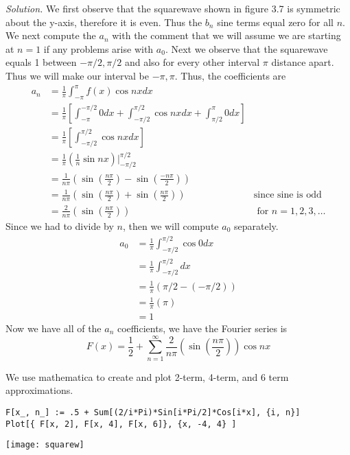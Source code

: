 \documentclass{article}
\begin{document}
\vspace{4mm} 
\textit{Solution.} We first observe that the squarewave shown in figure 3.7 is symmetric about the y-axis, therefore it is even. Thus the \(b_n\) sine terms equal zero for all \(n\). We next compute the \(a_n\) with the comment that we will assume we are starting at \(n=1\) if any problems arise with \(a_0\). Next we observe that the squarewave equals 1 between \(-\pi/2 , \pi/2\) and also for every other interval \(\pi\) distance apart. Thus we will make our interval be \( -\pi,\pi\). Thus, the coefficients are
 \begin{align*}
a_n &= \frac{1}{\pi} \int_{-\pi}^{\pi} f(x) \cos nx dx \\
&= \frac{1}{\pi}\left[ \int_{-\pi}^{-\pi/2} 0 dx + \int_{-\pi/2}^{\pi/2} \cos nx dx +  \int_{\pi/2}^{\pi} 0 dx\right] \\
&=  \frac{1}{\pi}\left[ \int_{-\pi/2}^{\pi/2} \cos nx dx  \right] \\
&=  \frac{1}{\pi} (\frac1n \sin nx ) \Big|_{-\pi/2}^{\pi/2} \\
&=  \frac{1}{n\pi} (\sin(\frac{n\pi}{2}) - \sin(\frac{-n\pi}{2} ) ) \\
&=  \frac{1}{n\pi} (\sin(\frac{n\pi}{2}) + \sin(\frac{n\pi}{2} ) )   &\text{since sine is odd }\\
&=  \frac{2}{n\pi} (\sin(\frac{n\pi}{2}))  & \text{ for } n=1,2,3,\ldots
\end{align*}
Since we had to divide by \(n\), then we will compute \(a_0\) separately. 
\begin{align*}
a_0 &=  \frac{1}{\pi} \int_{-\pi/2}^{\pi/2} \cos 0 dx \\
&=\frac{1}{\pi} \int_{-\pi/2}^{\pi/2} dx\\
&=\frac{1}{\pi} ( \pi/2 - (-\pi/2))\\
&= \frac{1}{\pi} (\pi) \\
&= 1
\end{align*}
Now we have all of the \(a_n\) coefficients, we have the Fourier series is
\[
F(x) = \frac12 + \sum_{n=1}^{\infty} \frac{2}{n\pi} (\sin(\frac{n\pi}{2}))\cos nx 
\]

\newpage
We use mathematica to create and plot 2-term, 4-term, and 6 term approximations. 

\begin{verbatim}
F[x_, n_] := .5 + Sum[(2/i*Pi)*Sin[i*Pi/2]*Cos[i*x], {i, n}]
Plot[{ F[x, 2], F[x, 4], F[x, 6]}, {x, -4, 4} ]
\end{verbatim}
\texttt{[image: squarew]}
\end{document}
